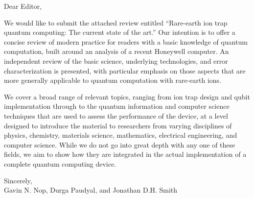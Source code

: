 \documentclass{letter}
\begin{document}
Dear Editor,

We would like to submit the attached review entitled “Rare-earth ion trap quantum computing: The current state of the art.”  Our intention is to offer a concise review of modern practice for readers with a basic knowledge of quantum computation, built around an analysis of a recent Honeywell computer. An independent review of the basic science, underlying technologies, and error characterization is presented, with particular emphasis on those aspects that are more generally applicable to quantum computation with rare-earth ions. 

We cover a broad range of relevant topics, ranging from ion trap design and qubit implementation through to the quantum information and computer science techniques that are used to assess the performance of the device, at a level designed to introduce the material to researchers from varying disciplines of physics, chemistry, materials science, mathematics, electrical engineering, and computer science. While we do not go into great depth with any one of these fields, we aim to show how they are integrated in the actual implementation of a complete quantum computing device.


Sincerely,\\
Gavin N. Nop, Durga Paudyal, and Jonathan D.H. Smith
\end{document}

